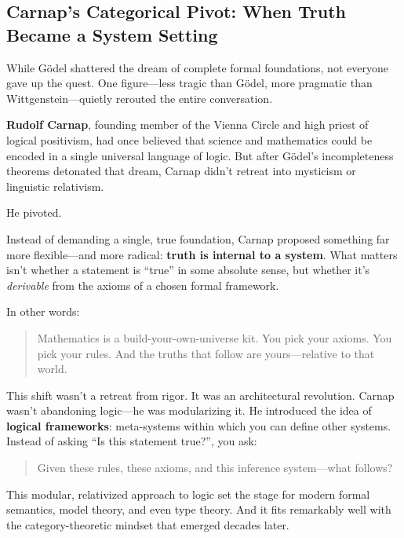 \subsection{Carnap’s Categorical Pivot: When Truth Became a System Setting}

While Gödel shattered the dream of complete formal foundations, not everyone gave up the quest. One figure—less tragic than Gödel, more pragmatic than Wittgenstein—quietly rerouted the entire conversation.

\textbf{Rudolf Carnap}, founding member of the Vienna Circle and high priest of logical positivism, had once believed that science and mathematics could be encoded in a single universal language of logic. But after Gödel’s incompleteness theorems detonated that dream, Carnap didn’t retreat into mysticism or linguistic relativism.

He pivoted.

Instead of demanding a single, true foundation, Carnap proposed something far more flexible—and more radical: \textbf{truth is internal to a system}. What matters isn’t whether a statement is “true” in some absolute sense, but whether it’s \textit{derivable} from the axioms of a chosen formal framework.

In other words: 

\begin{quote}
Mathematics is a build-your-own-universe kit. You pick your axioms. You pick your rules. And the truths that follow are yours—relative to that world.
\end{quote}

This shift wasn’t a retreat from rigor. It was an architectural revolution. Carnap wasn’t abandoning logic—he was modularizing it. He introduced the idea of \textbf{logical frameworks}: meta-systems within which you can define other systems. Instead of asking “Is this statement true?”, you ask:

\begin{quote}
Given these rules, these axioms, and this inference system—what follows?
\end{quote}

This modular, relativized approach to logic set the stage for modern formal semantics, model theory, and even type theory. And it fits remarkably well with the category-theoretic mindset that emerged decades later.

\vspace{1em}

